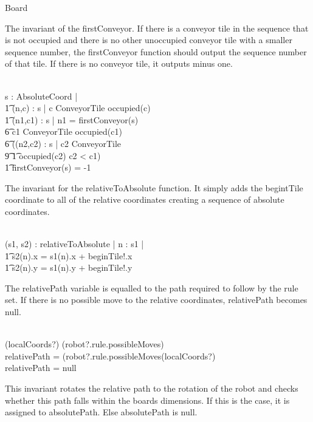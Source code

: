 \documentclass[12pt]{article}
\begin{document}
\begin{class}{Board}
\begin{nobothschema}
\begin{zpar}
The invariant of the firstConveyor. If there is a conveyor tile in the sequence that is not occupied and there is no other unoccupied conveyor tile with a smaller sequence number, the firstConveyor function should output the sequence number of that tile. If there is no conveyor tile, it outputs minus one.
\end{zpar} \\
\forall s : \power \seq AbsoluteCoord | \\ \t1
 \IF \exists (n,c) : s | c \in ConveyorTile \wedge \neg occupied(c) \\ \t1
 \THEN \exists (n1,c1) : s | n1 = firstConveyor(s) \; \; \wedge \\ \t6 c1 \in ConveyorTile \wedge \neg occupied(c1) \; \; \wedge \\ \t6
 (\neg \exists (n2,c2) : s | c2 \in ConveyorTile \; \; \wedge \\ \t9 \t1 \neg occupied(c2) \wedge c2 < c1) \\ \t1
 \ELSE firstConveyor(s) = -1
\end{nobothschema}
\znewpage
\begin{nobothschema}
\begin{zpar}
The invariant for the relativeToAbsolute function. It simply adds the begintTile coordinate to all of the relative coordinates creating a sequence of absolute coordinates.
\end{zpar} \\
\forall (s1, s2) : relativeToAbsolute | \forall n : \dom s1 | \\ \t1 s2(n).x = s1(n).x + beginTile!.x \; \; \wedge \\ \t1 s2(n).y = s1(n).y + beginTile!.y
\also \also \also
\begin{zpar}
The relativePath variable is equalled to the path required to follow by the rule set. If there is no possible move to the relative coordinates, relativePath becomes null.
\end{zpar} \\
\IF (localCoords?) \in \dom (robot?.rule.possibleMoves) \\
\THEN relativePath = \dom (robot?.rule.possibleMoves(localCoords?) \\
\ELSE relativePath = null \\
\also \also \also
\begin{zpar}
This invariant rotates the relative path to the rotation of the robot and checks whether this path falls within the boards dimensions. If this is the case, it is assigned to absolutePath. Else absolutePath is null.

\end{zpar}
\end{nobothschema}
\end{class}
\end{document}
